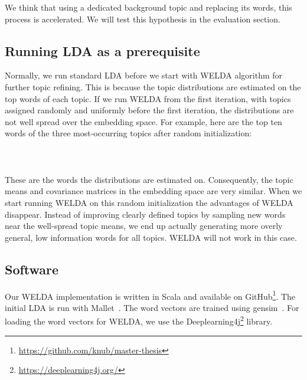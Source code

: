 \documentclass[
        a4paper,
        titlepage,
        twoside,
        parskip
        ]{scrbook}
\theoremstyle{break}
\begin{document}
We think that using a dedicated background topic and replacing its words, this process is accelerated.
We will test this hypothesis in the evaluation section.

\subsection{Running LDA as a prerequisite}
Normally, we run standard LDA before we start with WELDA algorithm for further topic refining.
This is because the topic distributions are estimated on the top words of each topic.
If we run WELDA from the first iteration, with topics assigned randomly and uniformly before the first iteration, the distributions are not well spread over the embedding space.
For example, here are the top ten words of the three most-occurring topics after random initialization: \\
\hspace*{0cm}  \\
\hspace*{0cm}  \\
\hspace*{0cm}  \\

These are the words the distributions are estimated on.
Consequently, the topic means and covariance matrices in the embedding space are very similar.
When we start running WELDA on this random initialization the advantages of WELDA disappear.
Instead of improving clearly defined topics by sampling new words near the well-spread topic means, we end up actually generating more overly general, low information words for all topics.
WELDA will not work in this case.

\subsection{Software}

Our WELDA implementation is written in Scala and available on GitHub\footnote{\url{https://github.com/knub/master-thesis}}.
The initial LDA is run with Mallet~\cite{McCallum2002}.
The word vectors are trained using gensim~\cite{Rehurek2010}.
For loading the word vectors for WELDA, we use the Deeplearning4j\footnote{\url{https://deeplearning4j.org/}} library.
\end{document}
